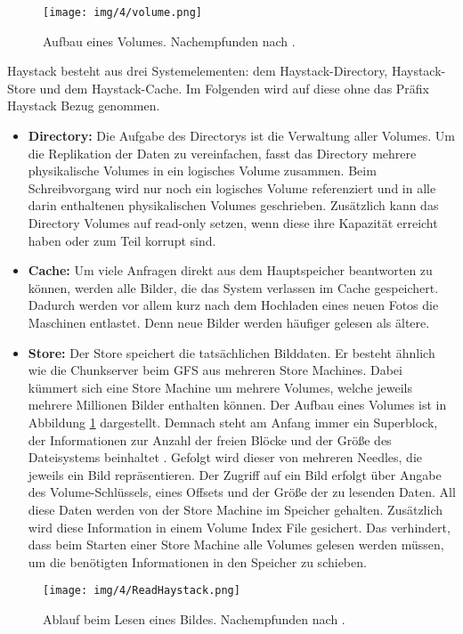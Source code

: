 \documentclass[12pt,oneside,a4paper,parskip]{scrbook}
\begin{document}
\begin{figure}
  \centering
  \texttt{[image: img/4/volume.png]}
  \caption[Aufbau eines Volumes]{ Aufbau eines Volumes. Nachempfunden nach \cite{haystack}.}
  \label{volume}
\end{figure}
Haystack besteht aus drei Systemelementen: dem Haystack-Directory, Haystack-Store und dem Haystack-Cache. Im Folgenden wird auf diese ohne das Präfix Haystack Bezug genommen.
\begin{itemize}
  \item \textbf{Directory:} Die Aufgabe des Directorys ist die Verwaltung aller Volumes. Um die Replikation der Daten zu vereinfachen, fasst das Directory mehrere physikalische Volumes in ein logisches Volume zusammen. Beim Schreibvorgang wird nur noch ein logisches Volume referenziert und in alle darin enthaltenen physikalischen Volumes geschrieben. Zusätzlich kann das Directory Volumes auf read-only setzen, wenn diese ihre Kapazität erreicht haben oder zum Teil korrupt sind.
  \item \textbf{Cache:} Um viele Anfragen direkt aus dem Hauptspeicher beantworten zu können, werden alle Bilder, die das System verlassen im Cache gespeichert. Dadurch werden vor allem kurz nach dem Hochladen eines neuen Fotos die Maschinen entlastet. Denn neue Bilder werden häufiger gelesen als ältere.
  \item \textbf{Store:} Der Store speichert die tatsächlichen Bilddaten. Er besteht ähnlich wie die Chunkserver beim GFS aus mehreren Store Machines. Dabei kümmert sich eine Store Machine um mehrere Volumes, welche jeweils mehrere Millionen Bilder enthalten können. Der Aufbau eines Volumes ist in Abbildung \ref{volume} dargestellt. Demnach steht am Anfang immer ein Superblock, der Informationen zur Anzahl der freien Blöcke und der Größe des Dateisystems beinhaltet \cite{wiki:superblock}. Gefolgt wird dieser von mehreren Needles, die jeweils ein Bild repräsentieren. Der Zugriff auf ein Bild erfolgt über Angabe des Volume-Schlüssels, eines Offsets und der Größe der zu lesenden Daten. All diese Daten werden von der Store Machine im Speicher gehalten. Zusätzlich wird diese Information in einem Volume Index File gesichert. Das verhindert, dass beim Starten einer Store Machine alle Volumes gelesen werden müssen, um die benötigten Informationen in den Speicher zu schieben. 
\end{itemize}

\begin{figure}[h]
  \centering
  \texttt{[image: img/4/ReadHaystack.png]}
  \caption[Ablauf beim Lesen eines Bildes.]{ Ablauf beim Lesen eines Bildes. Nachempfunden nach \cite{haystack}.}
  \label{readHaystack}
\end{figure}
\end{document}
